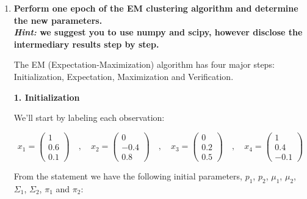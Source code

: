 \documentclass[12pt]{article}
\begin{document}
\vskip 0.2cm
\begin{enumerate}[leftmargin=\labelsep]
  \item \textbf{Perform one epoch of the EM clustering algorithm and determine the new parameters.}\\
        \textbf{\textit{Hint:} we suggest you to use numpy and scipy, however disclose the intermediary results step by step.}

        \vskip 0.3cm
        The EM (Expectation-Maximization) algorithm has four major steps: Initialization, Expectation, Maximization and Verification.

        \vskip 0.2cm
          {
            \color{stepscolor}
            \begin{large}\textbf{1. Initialization}\end{large}
          }
        \vskip 0.1cm

        We'll start by labeling each observation:

        $$
          x_1 = \begin{pmatrix} 1 \\ 0.6 \\ 0.1 \end{pmatrix}
          \quad,\quad
          x_2 = \begin{pmatrix} 0 \\ -0.4 \\ 0.8 \end{pmatrix}
          \quad,\quad
          x_3 = \begin{pmatrix} 0 \\ 0.2 \\ 0.5 \end{pmatrix}
          \quad,\quad
          x_4 = \begin{pmatrix} 1 \\ 0.4 \\ -0.1 \end{pmatrix}
        $$

        From the statement we have the following initial parameters, $p_1$, $p_2$, $\mu_1$, $\mu_2$, $\Sigma_1$,
        $\Sigma_2$, $\pi_1$ and $\pi_2$:


\end{enumerate}
\end{document}
